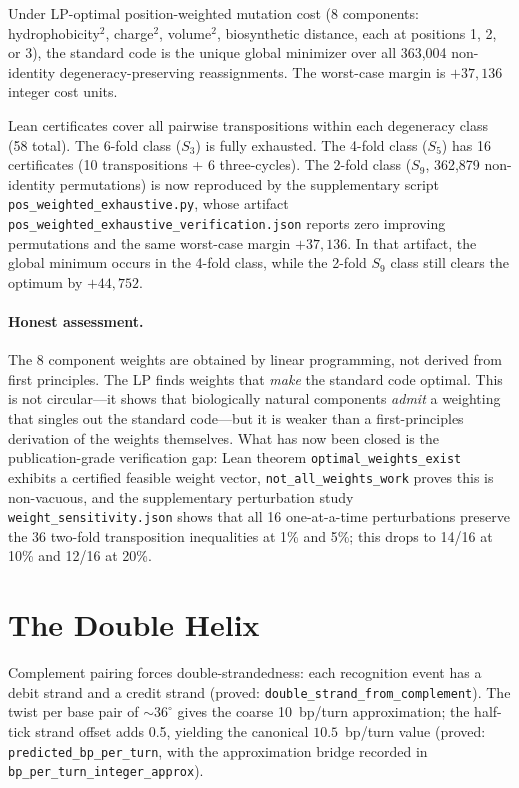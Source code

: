 \documentclass[11pt,twocolumn]{article}
\newcommand{\lean}[1]{\texttt{#1}}
\begin{document}
Under LP-optimal position-weighted mutation cost (8 components:
hydrophobicity$^2$, charge$^2$, volume$^2$, biosynthetic distance,
each at positions 1, 2, or 3), the standard code is the unique global
minimizer over all 363,004 non-identity degeneracy-preserving
reassignments. The worst-case margin is $+37{,}136$ integer cost units.

Lean certificates cover all pairwise transpositions within each
degeneracy class (58 total). The 6-fold class ($S_3$) is fully
exhausted. The 4-fold class ($S_5$) has 16 certificates (10
transpositions + 6 three-cycles). The 2-fold class ($S_9$, 362,879
non-identity permutations) is now reproduced by the supplementary script
\texttt{pos\_weighted\_exhaustive.py}, whose artifact
\texttt{pos\_weighted\_exhaustive\_verification.json} reports zero
improving permutations and the same worst-case margin $+37{,}136$. In that
artifact, the global minimum occurs in the 4-fold class, while the 2-fold
$S_9$ class still clears the optimum by $+44{,}752$.

\paragraph{Honest assessment.} The 8 component weights are obtained by
linear programming, not derived from first principles. The LP finds
weights that \emph{make} the standard code optimal. This is not
circular---it shows that biologically natural components \emph{admit} a
weighting that singles out the standard code---but it is weaker than a
first-principles derivation of the weights themselves. What has now been
closed is the publication-grade verification gap: Lean theorem
\lean{optimal\_weights\_exist} exhibits a certified feasible weight vector,
\lean{not\_all\_weights\_work} proves this is non-vacuous, and the
supplementary perturbation study \texttt{weight\_sensitivity.json}
shows that all 16 one-at-a-time perturbations preserve the 36 two-fold
transposition inequalities at 1\% and 5\%; this drops to 14/16 at 10\%
and 12/16 at 20\%.

\section{The Double Helix}

Complement pairing forces double-strandedness: each recognition event
has a debit strand and a credit strand (proved:
\lean{double\_strand\_from\_complement}). The twist per base pair of
$\sim 36^\circ$ gives the coarse 10~bp/turn approximation; the half-tick
strand offset adds 0.5, yielding the canonical $10.5$~bp/turn value
(proved: \lean{predicted\_bp\_per\_turn}, with the approximation bridge
recorded in \lean{bp\_per\_turn\_integer\_approx}).
\end{document}
